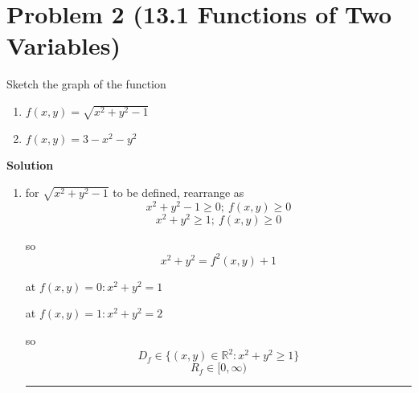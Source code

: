 \documentclass{article}
\newcommand{\solution}{\textbf{\large Solution}}
\theoremstyle{remark}
\begin{document}
\vspace{1em}
\hrulefill

\section*{Problem 2 (13.1 Functions of Two Variables)}
Sketch the graph of the function
\begin{enumerate}[label=(\alph*)]
    \item $f(x, y) = \sqrt{x^2 + y^2 - 1}$
    \item $f(x, y) = 3 - x^2 - y^2$
\end{enumerate}

\medskip
\solution

\begin{enumerate}[label=(\alph*)]
    \item for $\sqrt{x^2+y^2-1}$ to be defined, rearrange as
    \[
    x^2+y^2-1 \ge 0 ;\ f(x,y)\ge 0
    \]
    \[
    x^2+y^2 \ge 1 ;\ f(x,y)\ge 0
    \]

    so \[
    x^2+y^2 = f^2(x,y)+1
    \]

    at $f(x,y)=0 : x^2+y^2=1$

    at $f(x,y)=1 : x^2+y^2=2$

    so \[
    \boxed{D_f \in \{(x,y)\in \mathbb{R}^2 : x^2+y^2 \ge 1\}}
    \]
    \[
    \boxed{R_f \in [0,\infty)}
    \]

    \begin{center}
    \end{center}

    \medskip
    \begin{center}
    \rule{0.3\linewidth}{0.2pt}
    \end{center}
    \medskip


\end{enumerate}
\end{document}
